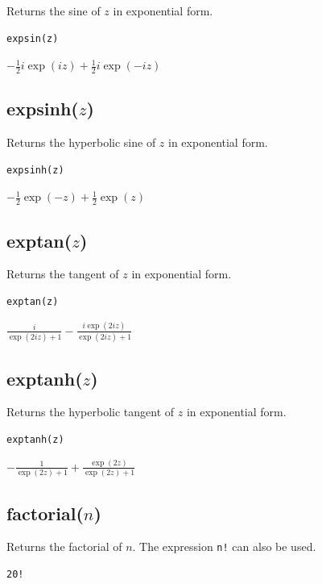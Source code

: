 \documentclass[12pt]{article}
\begin{document}
Returns the sine of $z$ in exponential form.

{\color{blue}
\begin{verbatim}
expsin(z)
\end{verbatim}
}

\noindent
$\displaystyle -\tfrac{1}{2}i\exp(iz)+\tfrac{1}{2}i\exp(-iz)$

\subsection*{expsinh($z$)}

Returns the hyperbolic sine of $z$ in exponential form.

{\color{blue}
\begin{verbatim}
expsinh(z)
\end{verbatim}
}

\noindent
$\displaystyle -\tfrac{1}{2}\exp(-z)+\tfrac{1}{2}\exp(z)$

\subsection*{exptan($z$)}

Returns the tangent of $z$ in exponential form.

{\color{blue}
\begin{verbatim}
exptan(z)
\end{verbatim}
}

\noindent
$\displaystyle \frac{i}{\exp(2iz)+1}-\frac{i\exp(2iz)}{\exp(2iz)+1}$

\subsection*{exptanh($z$)}

Returns the hyperbolic tangent of $z$ in exponential form.

{\color{blue}
\begin{verbatim}
exptanh(z)
\end{verbatim}
}

\noindent
$\displaystyle -\frac{1}{\exp(2z)+1}+\frac{\exp(2z)}{\exp(2z)+1}$

\subsection*{factorial($n$)}

Returns the factorial of $n$.
The expression {\tt n!} can also be used.

{\color{blue}
\begin{verbatim}
20!
\end{verbatim}
}
\end{document}
